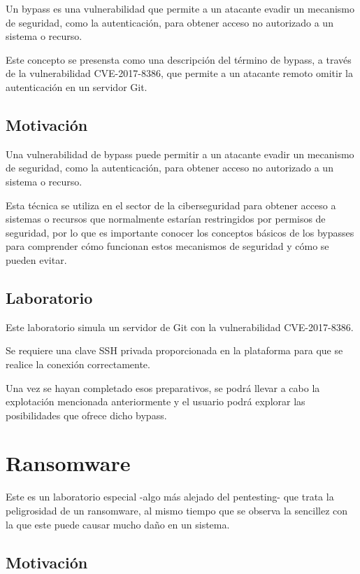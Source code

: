         Un bypass es una vulnerabilidad que permite a un atacante evadir un mecanismo de seguridad, como la autenticación, para obtener acceso no autorizado a un sistema o recurso.

        Este concepto se presensta como una descripción del término de bypass, a través de la vulnerabilidad CVE-2017-8386, que permite a un atacante remoto omitir la autenticación en un servidor Git.

        \subsection{Motivación}

            Una vulnerabilidad de bypass puede permitir a un atacante evadir un mecanismo de seguridad, como la autenticación, para obtener acceso no autorizado a un sistema o recurso.

            Esta técnica se utiliza en el sector de la ciberseguridad para obtener acceso a sistemas o recursos que normalmente estarían restringidos por permisos de seguridad, por lo que es importante conocer los conceptos básicos de los bypasses para comprender cómo funcionan estos mecanismos de seguridad y cómo se pueden evitar.

        \subsection{Laboratorio}

            Este laboratorio simula un servidor de Git con la vulnerabilidad CVE-2017-8386.

            Se requiere una clave SSH privada proporcionada en la plataforma para que se realice la conexión correctamente.

            Una vez se hayan completado esos preparativos, se podrá llevar a cabo la explotación mencionada anteriormente y el usuario podrá explorar las posibilidades que ofrece dicho bypass.


    \section{Ransomware}
        \label{sec:ransomware}
        
            Este es un laboratorio especial -algo más alejado del pentesting- que trata la peligrosidad de un ransomware, al mismo tiempo que se observa la sencillez con la que este puede causar mucho daño en un sistema.

        \subsection{Motivación}

